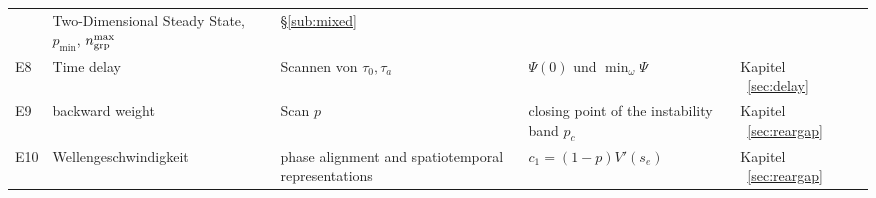 \documentclass[11pt,a4paper,openany]{book}
\numberwithin{equation}{chapter}
\numberwithin{figure}{chapter}
\numberwithin{table}{chapter}
\begin{document}
\begin{center}
\begin{tabular}{p{0.85cm}p{2.3cm}p{3.5cm}p{4.2cm}p{2.7cm}}
&




 Two-Dimensional Steady State, $p_{\min}$, $n_{\rm grp}^{\max}$




& \S\ref{sub:mixed} \\
E8 &




 Time delay& Scannen von $\tau_0,\tau_a$




&




 $\Psi(0)$ und $\min_\omega\Psi$




&




 Kapitel ~\ref{sec:delay}~



\\
E9 &






backward weight






&




Scan $p$




&






closing point of the instability band $p_c$






&




 Kapitel ~\ref{sec:reargap}~



\\
E10 &




 Wellengeschwindigkeit




&






phase alignment and spatiotemporal representations






& $c_1=(1-p)V'(s_e)$ &




 Kapitel ~\ref{sec:reargap}~




\end{tabular}
\end{center}
\end{document}
